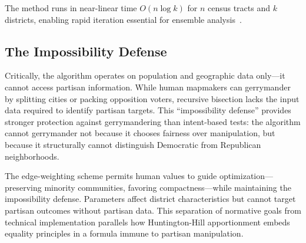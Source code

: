 The method runs in near-linear time $O(n \log k)$ for $n$ census tracts and $k$ districts, enabling rapid iteration essential for ensemble analysis~\cite{deluca2026recursive}.

\subsection{The Impossibility Defense}

Critically, the algorithm operates on population and geographic data only---it cannot access partisan information. While human mapmakers can gerrymander by splitting cities or packing opposition voters, recursive bisection lacks the input data required to identify partisan targets. This ``impossibility defense'' provides stronger protection against gerrymandering than intent-based tests: the algorithm cannot gerrymander not because it chooses fairness over manipulation, but because it structurally cannot distinguish Democratic from Republican neighborhoods.

The edge-weighting scheme permits human values to guide optimization---preserving minority communities, favoring compactness---while maintaining the impossibility defense. Parameters affect district characteristics but cannot target partisan outcomes without partisan data. This separation of normative goals from technical implementation parallels how Huntington-Hill apportionment embeds equality principles in a formula immune to partisan manipulation.
